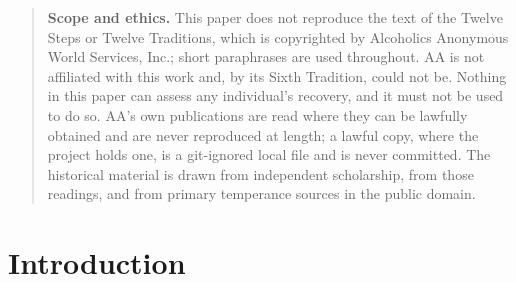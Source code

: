 \documentclass[11pt,a4paper]{article}
\begin{document}
\begin{abstract}
Third, a stochastic simulation with endogenous membership, respecting the
institutional fact that an AA group cannot refuse \emph{membership}, distinguishes
two channels of newcomer supply and shows that groups starved of exogenous
referrals decline demographically while per-member quality among survivors is
maintained or rises, whereas groups with exclusionary internal culture shrink,
close outright in one run in four, and remain viable in a little over half. Sensitivity analysis over all 118 registered numeric values
uses 1,002 global draws, 2,000 tiered and randomized-matrix draws, 944 multi-level
one-at-a-time points, twenty Morris trajectories, a 1,024-row Sobol base design on eight
leading parameters, and four structural variants beside the base, five architectures in all. In the 400-seed structural comparisons, referral
loss produces lower existence, endpoint viability and mean final membership than
pure attraction loss in all five architectures. The parameter screens report
strict, tied and reversed draws separately and do not turn that finite-domain
result into a universal claim. No parameter is estimated. The contribution is a
correspondence, a derivation, an accounting of what the analysis cannot support,
and a set of falsifiable predictions, several testable with records AA service
structures already keep.
\end{abstract}

\begin{quote}\small
\textbf{Scope and ethics.} This paper does not reproduce the text of the Twelve
Steps or Twelve Traditions, which is copyrighted by Alcoholics Anonymous World
Services, Inc.; short paraphrases are used throughout. AA is not affiliated with
this work and, by its Sixth Tradition, could not be. Nothing in this paper can
assess any individual's recovery, and it must not be used to do so. AA's own
publications are read where they can be lawfully obtained and are never reproduced
at length; a lawful copy, where the project holds one, is a git-ignored local file and
is never committed. The historical material is drawn from independent scholarship,
from those readings, and from primary temperance sources in the public domain.
\end{quote}

\tableofcontents
\newpage

\section{Introduction}
\end{document}
